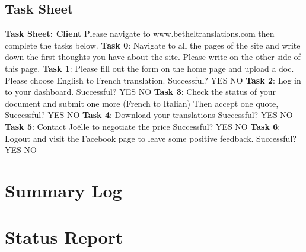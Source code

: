 \documentclass{l3proj}
\begin{document}
\section{Task Sheet}
\label{sect:task-sh}
\textbf{Task Sheet: Client}\newline 
Please navigate to www.betheltranslations.com then complete the tasks below. \newline \newline
\textbf{Task 0}: Navigate to all the pages of the site and write down the first thoughts you have about the site. Please write on the other side of this page. \newline \newline
\textbf{Task 1}: Please fill out the form on the home page and upload a doc. Please choose English to French translation. \newline \newline
Successful?    YES      NO \newline \newline
\textbf{Task 2}: Log in to your dashboard.  \newline \newline
Successful?    YES      NO \newline \newline
\textbf{Task 3}: Check the status of your document and submit one more (French to Italian) Then accept one quote, \newline \newline
Successful?    YES      NO \newline \newline
\textbf{Task 4}: Download your translations \newline \newline
Successful?    YES      NO \newline \newline
\textbf{Task 5}: Contact Jo\"{e}lle to negotiate the price \newline \newline
Successful?    YES      NO \newline \newline
\textbf{Task 6}: Logout and visit the Facebook page to leave some positive feedback. \newline \newline
Successful?    YES      NO \newline \newline
\chapter{Summary Log}


\chapter{Status Report}
 
 

    
\end{document}

